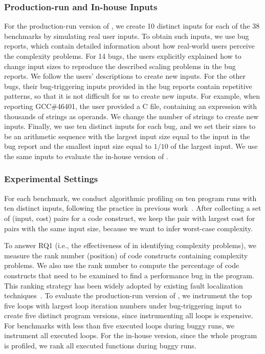 \subsubsection{Production-run and In-house Inputs}

For the production-run version of \Tool, we create 10 distinct inputs
for each of the 38 benchmarks by simulating real user inputs. 
To obtain such inputs, we use bug reports, 
which contain detailed information about how real-world 
users perceive the complexity problems. 
For 14 bugs, 
the users explicitly explained how to change input sizes 
to reproduce the described scaling problems in the bug reports. 
We follow the users' descriptions to create new inputs. 
For the other bugs, their bug-triggering inputs provided 
in the bug reports contain repetitive patterns, 
so that it is not difficult for us to create new inputs.
For example, when reporting GCC\#46401,
the user provided a C file, 
containing an expression with thousands of strings as operands. 
We change the number of strings to create new inputs. 
Finally, we use ten distinct inputs for each bug, 
and we set their sizes 
to be an arithmetic sequence with the largest input size
equal to the input in the bug report and the 
smallest input size equal to $1/10$ 
of the largest input.
We use the same inputs to evaluate the in-house version of \Tool. 




\subsubsection{Experimental Settings}

For each benchmark, we conduct algorithmic profiling on ten 
program runs with ten distinct inputs, following the practice in 
previous work~\cite{joy.asplos13,SongOOPSLA2014}.
After collecting a set of (input, cost) pairs for a code construct,
we keep the pair with largest cost for pairs with the same input size,
because we want to infer worst-case complexity. 


To answer RQ1 (i.e., the effectiveness of  \Tool in identifying
complexity problems), we measure the rank number (position) of code
constructs containing complexity problems. We also use the rank number
to compute the percentage of code constructs
that need to be examined to find a performance bug in the program.
This ranking strategy has been widely adopted by existing fault localization 
techniques~\cite{Jones05,Cleve05}.
To evaluate the production-run version of \Tool,
we instrument the top five loops with largest loop 
iteration numbers under bug-triggering input to create five distinct program versions, 
since instrumenting all loops is expensive. 
For benchmarks with less than five executed 
loops during buggy runs, 
we instrument all executed loops.  
For the in-house version, since the whole program is profiled, 
we rank all executed functions during buggy runs. 

